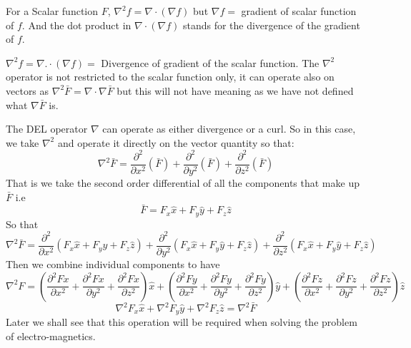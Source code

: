 For a Scalar function $F$, $\nabla^2f = \nabla \cdot (\nabla f)$ but $\nabla f =$ gradient of scalar function of $f$. And the dot product in $\nabla \cdot (\nabla f) $ stands for the divergence of the gradient of $f$.

$\nabla^2 f= \nabla .\cdot (\nabla f) =$ Divergence of gradient of the scalar function. The $\nabla^2 $ operator is not restricted to the scalar function only, it can operate also on vectors as $\nabla^2 \bar{F} = \nabla \cdot \nabla \bar{F}$ but this will not have meaning as we have not defined what $\nabla \bar{F}$ is.


The DEL operator $\nabla$ can operate as either divergence or a curl. So in this case, we take $\nabla^2$ and operate it directly on the vector quantity so that:
\begin{dmath}
\nabla^{2} \bar{F} = \frac{\partial ^ {2}}{\partial x^{2}}(\bar{F}) + \frac{\partial ^ {2}}{\partial y^{2}}(\bar{F}) + \frac{\partial ^ {2}}{\partial z^{2}}(\bar{F})
\end{dmath}
That is we take the second order differential of all the components that make up $\bar{F}$ i.e
\begin{equation*}
\bar{F} = F_{x}\hat x + F_{y}\hat y + F_{z}\hat z
\end{equation*}
So that
\begin{dmath}
\nabla^{2} \bar{F} = \frac{\partial ^ {2}}{\partial x^{2}}(F_{x}\hat x + F_{y}\hat y + F_{z}\hat z) + \frac{\partial ^ {2}}{\partial y^{2}}(F_{x}\hat x + F_{y}\hat y + F_{z}\hat z) + 
\frac{\partial ^ {2}}{\partial z^{2}}(F_{x}\hat x + F_{y}\hat y + F_{z}\hat z)
\end{dmath}
Then we combine individual components to have
\begin{dmath*}
\nabla^{2}F = (\frac{\partial ^{2} Fx}{\partial x^2} + \frac{\partial ^{2} Fx}{\partial y^2} + \frac{\partial ^{2} Fx}{\partial z^2})\hat{x} + (\frac{\partial ^{2} Fy}{\partial x^2} + \frac{\partial ^{2} Fy}{\partial y^2} + \frac{\partial ^{2} Fy}{\partial z^2})\hat{y} + (\frac{\partial ^{2} Fz}{\partial x^2} + \frac{\partial ^{2} Fz}{\partial y^2} + \frac{\partial ^{2} Fz}{\partial z^2})\hat{z}
\end{dmath*}
\begin{dmath}
\nabla^{2}F_x \hat x + \nabla^{2}F_y \hat y + \nabla^{2}F_z \hat z = \nabla^{2}\bar{F}
\end{dmath}
Later we shall see that this operation will be required when solving the problem of electro-magnetics.

